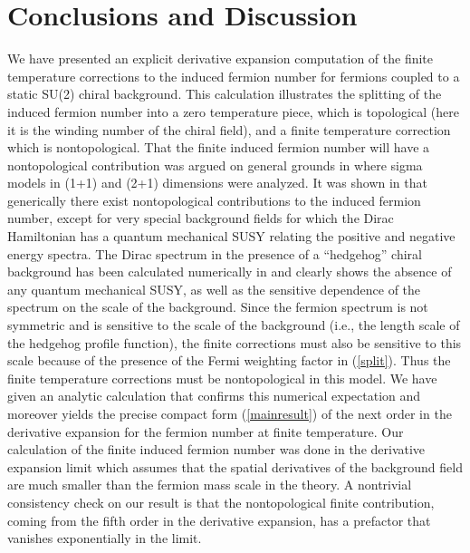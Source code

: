 \documentclass[a4paper,prd,showpacs,showkeys]{revtex4}
\begin{document}
{{\section{Conclusions and Discussion}
We have presented an explicit derivative expansion computation of the finite temperature corrections to the induced fermion number for fermions coupled to a static SU(2) chiral background. This calculation illustrates the splitting of the induced
fermion number into a zero temperature piece, which is topological (here it is the winding number of the chiral field), and a
finite temperature correction which is nontopological. That the finite
\coordHE{} induced fermion  number will have a nontopological contribution
was argued on general grounds in \cite{fluc,nonlinearsigma}
where sigma models in (1+1) and (2+1) dimensions were analyzed. It was
shown in that generically there exist nontopological contributions to the induced
fermion number, except for very special background fields for which the Dirac Hamiltonian
has a quantum mechanical SUSY relating the positive and negative energy spectra.  The Dirac spectrum in the presence of a ``hedgehog''
chiral background has been calculated numerically in \cite{ripka,kahana} and clearly shows the absence of any quantum mechanical SUSY, as well as the sensitive dependence of the
spectrum on the scale of the background. Since the fermion spectrum is
not symmetric and is sensitive to the scale of the background (i.e., the length scale of the hedgehog profile function), the finite \coordHE{} corrections must also be sensitive to this scale because
of the presence of the Fermi weighting factor \coordHE{} in
(\ref{split}). Thus the finite temperature corrections must be nontopological in this model. 
We have given an analytic calculation that confirms this numerical expectation and moreover yields the precise compact form (\ref{mainresult}) of the next order in the derivative expansion for the fermion number at finite temperature. 
Our calculation of the finite \coordHE{} induced fermion
number was done in the derivative expansion limit which assumes that
the spatial derivatives of the background field are much smaller
than the fermion mass scale in the theory. A nontrivial consistency check on our result is that the nontopological finite \coordHE{} contribution, coming from the fifth order in the derivative expansion, has a prefactor that vanishes exponentially in the \coordHE{} limit.  

}}
\end{document}
